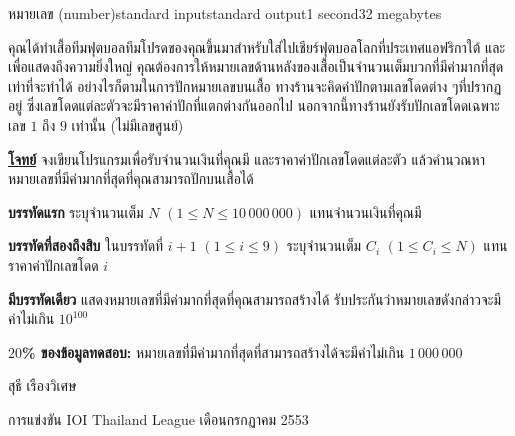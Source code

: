 \documentclass[11pt,a4paper]{article}
\begin{document}
\begin{problem}{หมายเลข (number)}{standard input}{standard output}{1 second}{32 megabytes}

คุณได้ทำเสื้อทีมฟุตบอลทีมโปรดของคุณขึ้นมาสำหรับใส่ไปเชียร์ฟุตบอลโลกที่ประเทศแอฟริกาใต้ และเพื่อแสดงถึงความยิ่งใหญ่ คุณต้องการให้หมายเลขด้านหลังของเสื้อเป็นจำนวนเต็มบวกที่มีค่ามากที่สุดเท่าที่จะทำได้ อย่างไรก็ตามในการปักหมายเลขบนเสื้อ ทางร้านจะคิดค่าปักตามเลขโดดต่าง ๆที่ปรากฏอยู่ ซึ่งเลขโดดแต่ละตัวจะมีราคาค่าปักที่แตกต่างกันออกไป นอกจากนี้ทางร้านยังรับปักเลขโดดเฉพาะเลข $1$ ถึง $9$ เท่านั้น (ไม่มีเลขศูนย์)

\bigskip
\underline{\textbf{โจทย์}}  จงเขียนโปรแกรมเพื่อรับจำนวนเงินที่คุณมี และราคาค่าปักเลขโดดแต่ละตัว แล้วคำนวณหาหมายเลขที่มีค่ามากที่สุดที่คุณสามารถปักบนเสื้อได้


\InputFile

\textbf{บรรทัดแรก} ระบุจำนวนเต็ม $N$ $(1 \leq N \leq 10\,000\,000)$ แทนจำนวนเงินที่คุณมี

\textbf{บรรทัดที่สองถึงสิบ} ในบรรทัดที่ $i+1$ $(1 \leq i \leq 9)$ ระบุจำนวนเต็ม $C_i$ $(1 \leq C_i \leq N)$ แทนราคาค่าปักเลขโดด $i$

\OutputFile

\textbf{มีบรรทัดเดียว} แสดงหมายเลขที่มีค่ามากที่สุดที่คุณสามารถสร้างได้ รับประกันว่าหมายเลขดังกล่าวจะมีค่าไม่เกิน $10^{100}$

\Examples

\begin{example}
%
%
\end{example}

\Scoring

\textbf{$20$\% ของข้อมูลทดสอบ:} หมายเลขที่มีค่ามากที่สุดที่สามารถสร้างได้จะมีค่าไม่เกิน $1\,000\,000$

\Source

สุธี เรืองวิเศษ

การแข่งขัน IOI Thailand League เดือนกรกฏาคม 2553

\end{problem}
\end{document}
